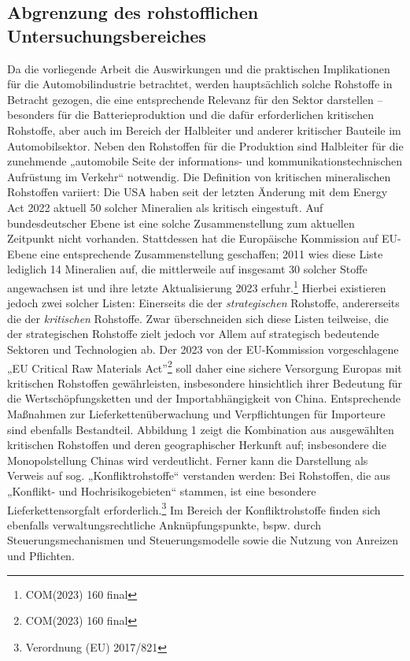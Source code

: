 \documentclass[12pt,a4paper,oneside]{book} %
\begin{document}
\subsection{Abgrenzung des rohstofflichen Untersuchungsbereiches}
Da die vorliegende Arbeit die Auswirkungen und die praktischen Implikationen für die Automobilindustrie betrachtet, werden hauptsächlich solche Rohstoffe in Betracht gezogen, die eine entsprechende Relevanz für den Sektor darstellen – besonders für die Batterieproduktion und die dafür erforderlichen kritischen Rohstoffe, aber auch im Bereich der Halbleiter und anderer kritischer Bauteile im Automobilsektor. Neben den Rohstoffen für die Produktion sind Halbleiter für die zunehmende „automobile Seite der informations- und kommunikationstechnischen Aufrüstung im Verkehr“\autocite[26f.]{schelewsky_vulnerabilitat_2017} notwendig. Die Definition von kritischen mineralischen Rohstoffen variiert: Die USA haben seit der letzten Änderung mit dem Energy Act 2022 aktuell 50 solcher Mineralien als kritisch eingestuft.\autocite{u_s_geological_survey_final_2022} Auf bundesdeutscher Ebene ist eine solche Zusammenstellung zum aktuellen Zeitpunkt nicht vorhanden. Stattdessen hat die Europäische Kommission auf EU-Ebene eine entsprechende Zusammenstellung geschaffen; 2011 wies diese Liste lediglich 14 Mineralien auf, die mittlerweile auf insgesamt 30 solcher Stoffe angewachsen ist und ihre letzte Aktualisierung 2023 erfuhr.\footnote{COM(2023) 160 final} Hierbei existieren jedoch zwei solcher Listen: Einerseits die der \textit{strategischen} Rohstoffe, andererseits die der \textit{kritischen} Rohstoffe.\autocite[vgl. auch]{falke_neue_2023} Zwar überschneiden sich diese Listen teilweise, die der strategischen Rohstoffe zielt jedoch vor Allem auf strategisch bedeutende Sektoren und Technologien ab. 
Der 2023 von der EU-Kommission vorgeschlagene „EU Critical Raw Materials Act”\footnote{COM(2023) 160 final} soll daher eine sichere Versorgung Europas mit kritischen Rohstoffen gewährleisten, insbesondere hinsichtlich ihrer Bedeutung für die Wertschöpfungsketten und der Importabhängigkeit von China. Entsprechende Maßnahmen zur Lieferkettenüberwachung und Verpflichtungen für Importeure sind ebenfalls Bestandteil. Abbildung 1 zeigt die Kombination aus ausgewählten kritischen Rohstoffen und deren geographischer Herkunft auf; insbesondere die Monopolstellung Chinas wird verdeutlicht. Ferner kann die Darstellung als Verweis auf sog. „Konfliktrohstoffe“ verstanden werden: Bei Rohstoffen, die aus „Konflikt- und Hochrisikogebieten“ stammen, ist eine besondere Lieferkettensorgfalt erforderlich.\footnote{Verordnung (EU) 2017/821} Im Bereich der Konfliktrohstoffe finden sich ebenfalls verwaltungsrechtliche Anknüpfungspunkte, bspw. durch Steuerungsmechanismen und Steuerungsmodelle sowie die Nutzung von Anreizen und Pflichten.\autocite[ausführlich am Beispiel der USA]{nowrot_rohstoffhandel_2016}
\end{document}
